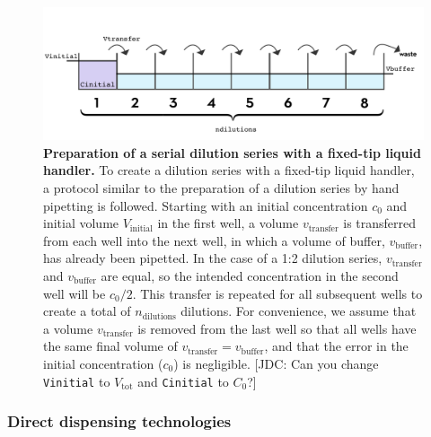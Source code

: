 \documentclass[aps,pre,twocolumn,nofootinbib,superscriptaddress,linenumbers]{revtex4-1}
\begin{document}
\begin{figure}[tb]
    \includegraphics[width=\columnwidth]{../figures/dilution.pdf}

  \caption{{\bf Preparation of a serial dilution series with a fixed-tip liquid handler.}
  To create a dilution series with a fixed-tip liquid handler, a protocol similar to the preparation of a dilution series by hand pipetting is followed.
  Starting with an initial concentration $c_0$ and initial volume $V_\mathrm{initial}$ in the first well, a volume $v_\mathrm{transfer}$ is transferred from each well into the next well, in which a volume of buffer, $v_\mathrm{buffer}$, has already been pipetted. 
  In the case of a 1:2 dilution series, $v_\mathrm{transfer}$ and $v_\mathrm{buffer}$ are equal, so the intended concentration in the second well will be $c_0/2$. 
  This transfer is repeated for all subsequent wells to create a total of $n_\mathrm{dilutions}$ dilutions. 
  For convenience, we assume that a volume $v_\mathrm{transfer}$ is removed from the last well so that all wells have the same final volume of $v_\mathrm{transfer} = v_\mathrm{buffer}$, and that the error in the initial concentration ($c_0$) is negligible.
  {\color{red}[JDC: Can you change {\tt Vinitial} to $V_\mathrm{tot}$ and {\tt Cinitial} to $C_0$?]}
  }
  \label{fig:dilution}
\end{figure}

\subsubsection*{Direct dispensing technologies}
\end{document}
